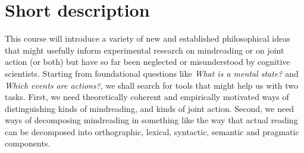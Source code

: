 \documentclass[12pt,\papersize]{extarticle}
\begin{document}
\setlength\footnotesep{1em}




\maketitle
%
%




\section{Short description}
This course will introduce a variety of new and established philosophical ideas that might usefully inform experimental research on mindreading or on joint action (or both) but have so far been neglected or misunderstood by cognitive scientists.
Starting from foundational questions like 
 	\emph{What is a mental state?} and 
	\emph{Which events are actions?},
we shall search for tools that might help us with two tasks.  
First, we need theoretically coherent and empirically motivated ways of distinguishing kinds of mindreading, and kinds of joint action.
Second, we need ways of decomposing mindreading in something like the way that actual reading can be decomposed into orthographic, lexical, syntactic, semantic and pragmatic components.



%
	
\end{document}
